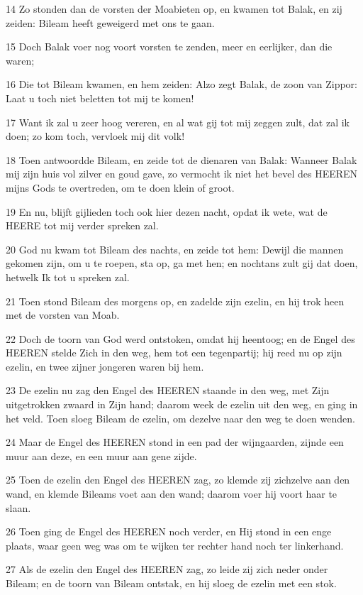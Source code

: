 \par 14 Zo stonden dan de vorsten der Moabieten op, en kwamen tot Balak, en zij zeiden: Bileam heeft geweigerd met ons te gaan.
\par 15 Doch Balak voer nog voort vorsten te zenden, meer en eerlijker, dan die waren;
\par 16 Die tot Bileam kwamen, en hem zeiden: Alzo zegt Balak, de zoon van Zippor: Laat u toch niet beletten tot mij te komen!
\par 17 Want ik zal u zeer hoog vereren, en al wat gij tot mij zeggen zult, dat zal ik doen; zo kom toch, vervloek mij dit volk!
\par 18 Toen antwoordde Bileam, en zeide tot de dienaren van Balak: Wanneer Balak mij zijn huis vol zilver en goud gave, zo vermocht ik niet het bevel des HEEREN mijns Gods te overtreden, om te doen klein of groot.
\par 19 En nu, blijft gijlieden toch ook hier dezen nacht, opdat ik wete, wat de HEERE tot mij verder spreken zal.
\par 20 God nu kwam tot Bileam des nachts, en zeide tot hem: Dewijl die mannen gekomen zijn, om u te roepen, sta op, ga met hen; en nochtans zult gij dat doen, hetwelk Ik tot u spreken zal.
\par 21 Toen stond Bileam des morgens op, en zadelde zijn ezelin, en hij trok heen met de vorsten van Moab.
\par 22 Doch de toorn van God werd ontstoken, omdat hij heentoog; en de Engel des HEEREN stelde Zich in den weg, hem tot een tegenpartij; hij reed nu op zijn ezelin, en twee zijner jongeren waren bij hem.
\par 23 De ezelin nu zag den Engel des HEEREN staande in den weg, met Zijn uitgetrokken zwaard in Zijn hand; daarom week de ezelin uit den weg, en ging in het veld. Toen sloeg Bileam de ezelin, om dezelve naar den weg te doen wenden.
\par 24 Maar de Engel des HEEREN stond in een pad der wijngaarden, zijnde een muur aan deze, en een muur aan gene zijde.
\par 25 Toen de ezelin den Engel des HEEREN zag, zo klemde zij zichzelve aan den wand, en klemde Bileams voet aan den wand; daarom voer hij voort haar te slaan.
\par 26 Toen ging de Engel des HEEREN noch verder, en Hij stond in een enge plaats, waar geen weg was om te wijken ter rechter hand noch ter linkerhand.
\par 27 Als de ezelin den Engel des HEEREN zag, zo leide zij zich neder onder Bileam; en de toorn van Bileam ontstak, en hij sloeg de ezelin met een stok.
